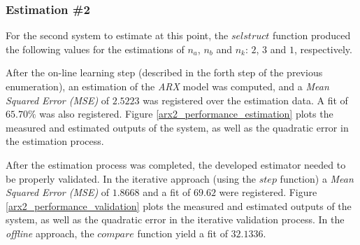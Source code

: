 \documentclass[12pt]{article}
\begin{document}
\subsubsection{Estimation \#2}

For the second system to estimate at this point, the $selstruct$ function produced the following values for the estimations of $n_{a}$, $n_{b}$ and $n_{k}$: $2$, $3$ and $1$, respectively.

After the on-line learning step (described in the forth step of the previous enumeration), an estimation of the \emph{ARX} model was computed, and a \emph{Mean Squared Error (MSE)} of $2.5223$ was registered over the estimation data. A fit of $65.70\%$ was also registered. Figure \ref{arx2_performance_estimation} plots the measured and estimated outputs of the system, as well as the quadratic error in the estimation process.

After the estimation process was completed, the developed estimator needed to be properly validated. In the iterative approach (using the $step$ function) a \emph{Mean Squared Error (MSE)} of $1.8668$ and a fit of $69.62$ were registered. Figure \ref{arx2_performance_validation} plots the measured and estimated outputs of the system, as well as the quadratic error in the iterative validation process. In the \emph{offline} approach, the $compare$ function yield a fit of $32.1336$.
\end{document}
